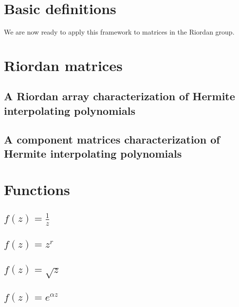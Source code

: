 
\section{Basic definitions}



We are now ready to apply this framework to matrices in the Riordan group.

\section{Riordan matrices}



\subsection{A Riordan array characterization of Hermite interpolating polynomials}



\subsection{A component matrices characterization of Hermite interpolating polynomials}



\section{Functions}

\subsection{$f(z)=\frac{1}{z}$}



\subsection{$f(z)=z^{r}$}



\subsection{$f(z)=\sqrt{z}$}



\subsection{$f(z)=e^{\alpha z}$}


